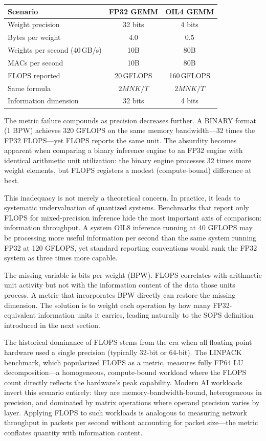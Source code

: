 \begin{center}
\tablestyle
\begin{tabular}{lcc}
\toprule
\textbf{Scenario} & \textbf{FP32 GEMM} & \textbf{OIL4 GEMM} \\
\midrule
Weight precision & 32 bits & 4 bits \\
Bytes per weight & 4.0 & 0.5 \\
Weights per second (40\,GB/s) & 10B & 80B \\
MACs per second & 10B & 80B \\
FLOPS reported & 20\,GFLOPS & 160\,GFLOPS \\
Same formula & $2MNK/T$ & $2MNK/T$ \\
Information dimension & 32 bits & 4 bits \\
\bottomrule
\end{tabular}
\end{center}

The metric failure compounds as precision decreases further. A BINARY format (1 BPW) achieves 320 GFLOPS on the same memory bandwidth---32 times the FP32 FLOPS---yet FLOPS reports the same unit. The absurdity becomes apparent when comparing a binary inference engine to an FP32 engine with identical arithmetic unit utilization: the binary engine processes 32 times more weight elements, but FLOPS registers a modest (compute-bound) difference at best.

This inadequacy is not merely a theoretical concern. In practice, it leads to systematic undervaluation of quantized systems. Benchmarks that report only FLOPS for mixed-precision inference hide the most important axis of comparison: information throughput. A system OIL8 inference running at 40 GFLOPS may be processing more useful information per second than the same system running FP32 at 120 GFLOPS, yet standard reporting conventions would rank the FP32 system as three times more capable.

The missing variable is bits per weight (BPW). FLOPS correlates with arithmetic unit activity but not with the information content of the data those units process. A metric that incorporates BPW directly can restore the missing dimension. The solution is to weight each operation by how many FP32-equivalent information units it carries, leading naturally to the SOPS definition introduced in the next section.

The historical dominance of FLOPS stems from the era when all floating-point hardware used a single precision (typically 32-bit or 64-bit). The LINPACK benchmark, which popularized FLOPS as a metric, measures fully FP64 LU decomposition---a homogeneous, compute-bound workload where the FLOPS count directly reflects the hardware's peak capability. Modern AI workloads invert this scenario entirely: they are memory-bandwidth-bound, heterogeneous in precision, and dominated by matrix operations where operand precision varies by layer. Applying FLOPS to such workloads is analogous to measuring network throughput in packets per second without accounting for packet size---the metric conflates quantity with information content.

